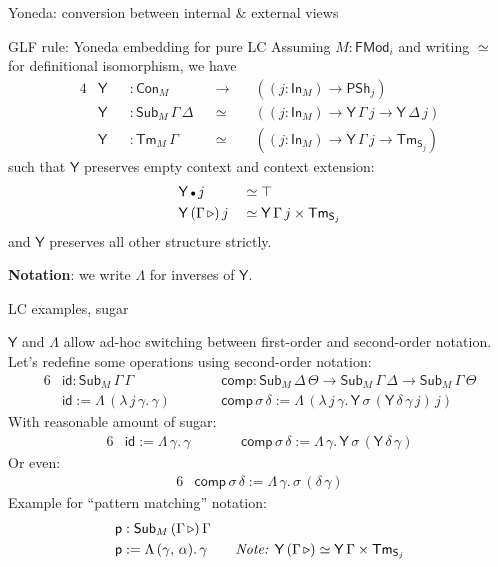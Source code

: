 \documentclass[dvipsnames,aspectratio=169]{beamer}
\newcommand{\ms}[1]{\mathsf{#1}}
\newcommand{\Con}{\mathsf{Con}}
\newcommand{\Sub}{\mathsf{Sub}}
\newcommand{\Tm}{\mathsf{Tm}}
\newcommand{\Y}{\mathsf{Y}}
\newcommand{\In}{\mathsf{In}}
\newcommand{\PSh}{\mathsf{PSh}}
\newcommand{\FMod}{\mathsf{FMod}}
\newcommand{\ext}{\triangleright}
\newcommand{\emptycon}{\scaleobj{.75}\bullet}
\renewcommand{\S}{\mathsf{S}}
\begin{document}
\begin{frame}{Yoneda: conversion between internal \& external views}

\begin{block}{GLF rule: Yoneda embedding for pure LC}
Assuming $M : \FMod_i$ and writing $\simeq$ for definitional isomorphism, we have
\begin{alignat*}{4}
  & \Y && : \Con_M                 &&\to\,  &&((j : \In_M) \to \PSh_j) \\
  & \Y && : \Sub_M\,\Gamma\,\Delta &&\simeq &&((j : \In_M) \to \Y\,\Gamma\,j \to \Y\,\Delta\,j)\\
  & \Y && : \Tm_M\,\Gamma          &&\simeq &&((j : \In_M) \to \Y\,\Gamma\,j \to \Tm_{\S_j})
\end{alignat*}
such that $\Y$ preserves empty context and context extension:
\begin{alignat*}{4}
  & \Y\,\emptycon\,j &&\simeq \top \\
  & \Y\,(\Gamma\,\ext)\,j &&\simeq \Y\,\Gamma\,j \times \Tm_{\S_j}
\end{alignat*}
and $\Y$ preserves all other structure strictly.
\end{block}
\textbf{Notation}: we write $\Lambda$ for inverses of $\Y$.
\end{frame}

\begin{frame}{LC examples, sugar}

$\Y$ and $\Lambda$ allow ad-hoc switching between first-order and second-order notation.
Let's redefine some operations using second-order notation:
\begin{alignat*}{6}
  & \ms{id} : \Sub_M\,\Gamma\,\Gamma && \ms{comp} : \Sub_M\,\Delta\,\Theta \to \Sub_M\,\Gamma\,\Delta \to \Sub_M\,\Gamma\,\Theta\\
  & \ms{id} := \Lambda\,(\lambda\,j\,\gamma.\,\gamma)\quad\quad && \ms{comp}\,\sigma\,\delta := \Lambda\,(\lambda\,j\,\gamma.\,\Y\,\sigma\,(\Y\,\delta\,\gamma\,j)\,j)
\end{alignat*}
\pause
With reasonable amount of sugar:
\begin{alignat*}{6}
  & \ms{id} := \Lambda\,\gamma.\,\gamma\quad\quad && \ms{comp}\,\sigma\,\delta := \Lambda\,\gamma.\,\Y\,\sigma\,(\Y\,\delta\,\gamma)
\end{alignat*}
\pause
Or even:
\begin{alignat*}{6}
  &\ms{comp}\,\sigma\,\delta := \Lambda\,\gamma.\,\sigma\,(\delta\,\gamma)
\end{alignat*}
\pause
Example for ``pattern matching'' notation:
\begin{alignat*}{3}
  & \ms{p} : \Sub_M\,(\Gamma\,\ext)\,\Gamma \\
  & \ms{p} := \Lambda\,(\gamma,\,\alpha).\,\gamma \quad\quad \text{\emph{Note: $\Y\,(\Gamma\,\ext) \simeq \Y\,\Gamma \times \Tm_{\S_j}$}}
\end{alignat*}

\end{frame}
\end{document}
